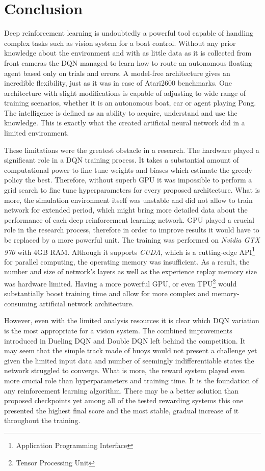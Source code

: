 \chapter{Conclusion}
\label{cha:conclusion}

Deep reinforcement learning is undoubtedly a powerful tool capable of handling complex tasks such as vision system for a boat control.
Without any prior knowledge about the environment and with as little data as it is collected from front cameras the DQN managed to
learn how to route an autonomous floating agent based only on trials and errors. A model-free architecture gives an incredible
flexibility, just as it was in case of Atari2600 benchmarks. One architecture with slight modifications is capable of adjusting to wide
range of training scenarios, whether it is an autonomous boat, car or agent playing Pong. The intelligence is defined as an ability to
acquire, understand and use the knowledge. This is exactly what the created artificial neural network did in a limited environment.

These limitations were the greatest obstacle in a research. The hardware played a significant role in a DQN training process. It takes a
substantial amount of computational power to fine tune weights and biases which estimate the greedy policy the best. Therefore, without
superb GPU it was impossible to perform a grid search to fine tune hyperparameters for every proposed architecture. What is more, the
simulation environment itself was unstable and did not allow to train network for extended period, which might bring more detailed data
about the performance of each deep reinforcement learning network. GPU played a crucial role in the research process, therefore in order
to improve results it would have to be replaced by a more powerful unit. The training was performed on \emph{Nvidia GTX 970} with 4GB RAM. Although it supports \emph{CUDA}, which is a cutting-edge API\footnote{Application Programming Interface} for parallel computing, the
operating memory was insufficient. As a result, the number and size of network's layers as well as the experience replay memory size was
hardware limited. Having a more powerful GPU, or even TPU\footnote{Tensor Processing Unit} would substantially boost training time and
allow for more complex and memory-consuming artificial network architecture.

However, even with the limited analysis resources it is clear which DQN variation is the most appropriate for a vision system. The
combined improvements introduced in Dueling DQN and Double DQN left behind the competition. It may seem that the simple track made of
buoys would not present a challenge yet given the limited input data and number of seemingly indifferentiable states the network
struggled to converge. What is more, the reward system played even more crucial role than hyperparameters and training time. It is
the foundation of any reinforcement learning algorithm. There may be a better solution than proposed checkpoints yet among all of the
tested rewarding systems this one presented the highest final score and the most stable, gradual increase of it throughout the training.

